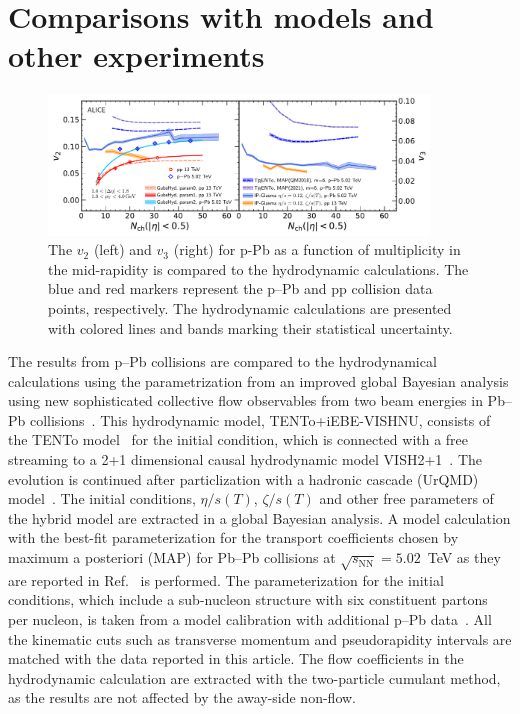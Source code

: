 \section{Comparisons with models and other experiments}
\label{sec:theory}

\begin{figure}[h!]
	\centering
	\includegraphics[width=0.9\textwidth]{figures/Fig6_v2Mult_allSystems_Hydro.pdf} 
	\caption{The $v_2$ (left) and $v_3$ (right) for p-Pb as a function of multiplicity in the mid-rapidity is compared to the hydrodynamic calculations. The blue and red markers represent the p--Pb and pp collision data points, respectively. The hydrodynamic calculations are presented with colored lines and bands marking their statistical uncertainty.} 
	\label{fig:vnmult_model}
\end{figure}

The results from p--Pb collisions are compared to the hydrodynamical calculations using the parametrization from an improved global Bayesian analysis using new sophisticated collective flow observables from two beam energies in Pb--Pb collisions~\cite{Parkkila:2021yha}. This hydrodynamic model, {TENTo}+iEBE-VISHNU, consists of the {TENTo} model~\cite{Moreland:2014oya} for the initial condition, which is connected with a free streaming to a 2+1 dimensional causal hydrodynamic model VISH2+1~\cite{Shen:2014vra}. The evolution is continued after particlization with a hadronic cascade (UrQMD) model~\cite{Bass:1998ca,Bleicher:1999xi}. The initial conditions, $\eta/s(T)$, $\zeta/s(T)$ and other free parameters of the hybrid model are extracted in a global Bayesian analysis.
A model calculation with the best-fit parameterization for the transport coefficients chosen by maximum a posteriori (MAP) for Pb--Pb collisions at $\sqrt{s_{\text{NN}}}=5.02$~TeV as they are reported in Ref.~\cite{Parkkila:2021yha} is performed. The parameterization for the initial conditions, which include a sub-nucleon structure with six constituent partons per nucleon, is taken from a model calibration with additional p--Pb data~\cite{Moreland:2018gsh}. All the kinematic cuts such as transverse momentum and pseudorapidity intervals are matched with the data reported in this article. The flow coefficients in the hydrodynamic calculation are extracted with the two-particle cumulant method, as the results are not affected by the away-side non-flow.

